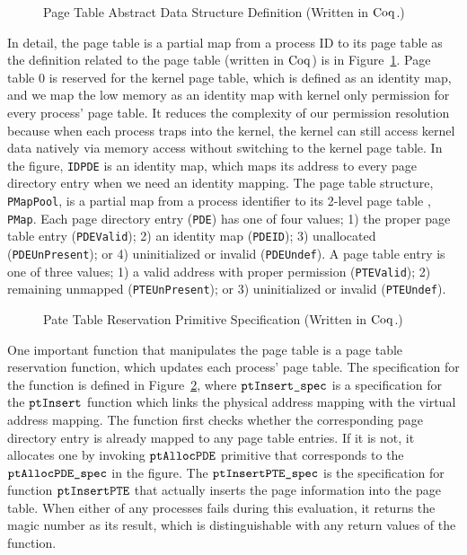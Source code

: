 \begin{figure}
 
\caption{Page Table Abstract Data Structure Definition (Written in $\mathrm{Coq}$.)}
\label{fig:chapter:certikos:page-table}
\end{figure}
In detail, the page table is a partial map from a process ID to its page table as the definition related to the page table (written in $\mathrm{Coq}$) is in
Figure~\ref{fig:chapter:certikos:page-table}. 
Page table 0 is reserved for the kernel page table, which is defined as an identity map,
and we map the low memory as an identity map with kernel only permission
for every process' page table.
It reduces the complexity of our permission resolution because when each process traps into the kernel,
the kernel can still access kernel data natively via memory access
without switching to the kernel page table. 
In the figure, 
\lstinline$IDPDE$ is an identity  map, which maps its address to every page directory entry when we need an identity mapping.
The page table structure, \lstinline$PMapPool$, is a partial map from a process identifier to its 2-level page table , \lstinline$PMap$.
 Each page directory entry (\lstinline$PDE$) has one of four values;
 1) the proper page table entry (\lstinline$PDEValid$); 2) an identity map (\lstinline$PDEID$); 3) unallocated (\lstinline$PDEUnPresent$); or 4) uninitialized or invalid (\lstinline$PDEUndef$). 
A page table entry is one of three values;
1)  a valid address with proper permission (\lstinline$PTEValid$); 2) remaining unmapped (\lstinline$PTEUnPresent$);
 or 3) uninitialized or invalid (\lstinline$PTEUndef$).

 \begin{figure}
 
\caption{Pate Table Reservation Primitive Specification (Written in $\mathrm{Coq}$.)}
\label{fig:chapter:certikos:ptresv-func}
\end{figure}
 One important function that manipulates the page table is a page table reservation function,
 which updates each process' page table.
 The specification for the function is defined in Figure~\ref{fig:chapter:certikos:ptresv-func},
  where  ${\mathrm{\texttt{ptInsert\_spec}}}$ is a specification for the ${\mathrm{\texttt{ptInsert}}}$ function which links 
the physical address mapping with the virtual address mapping. 
The function first checks whether the corresponding page directory entry is already mapped to any page table entries.
If it is not, it allocates one by invoking ${\mathrm{\texttt{ptAllocPDE}}}$ primitive that corresponds to the  ${\mathrm{\texttt{ptAllocPDE\_spec}}}$
in the figure.
The ${\mathrm{\texttt{ptInsertPTE\_spec}}}$ is the specification for function ${\mathrm{\texttt{ptInsertPTE}}}$ that actually inserts the page 
information into the page table. 
When either of any processes fails during this evaluation, it returns the magic number as its result, which is distinguishable with 
any return values of the function.


